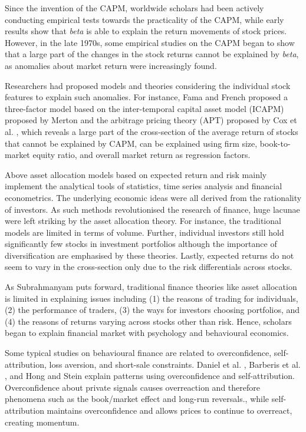 Since the invention of the CAPM, worldwide scholars had been actively conducting empirical tests towards the practicality of the CAPM, while early results show that \textit{beta} is able to explain the return movements of stock prices. However, in the late 1970s, some empirical studies on the CAPM began to show that a large part of the changes in the stock returns cannot be explained by \textit{beta}, as anomalies about market return were increasingly found.

Researchers had proposed models and theories considering the individual stock features to explain such anomalies. For instance, Fama and French \cite{intertemporal, options} proposed a three-factor model based on the inter-temporal capital asset model (ICAPM)  proposed by Merton \cite{riskfactors} and the arbitrage pricing theory (APT) proposed by Cox et al. \cite{anomalies}, which reveals a large part of the cross-section of the average return of stocks that cannot be explained by CAPM, can be explained using firm size, book-to-market equity ratio, and overall market return as regression factors.

Above asset allocation models based on expected return and risk mainly implement the analytical tools of statistics, time series analysis and financial econometrics. The underlying economic ideas were all derived from the rationality of investors. As such methods revolutionised the research of finance, huge lacunae were left striking by the asset allocation theory. For instance, the traditional models are limited in terms of volume. Further, individual investors still hold significantly few stocks in investment portfolios although the importance of diversification are emphasised by these theories. Lastly, expected returns do not seem to vary in the cross-section only due to the risk differentials across stocks.

As Subrahmanyam \cite{subrahmanyam2008behavioural} puts forward, traditional finance theories like asset allocation is limited in explaining issues including (1) the reasons of trading for individuals, (2) the performance of traders, (3) the ways for investors choosing portfolios, and (4) the reasons of returns varying across stocks other than risk. Hence, scholars began to explain financial market with psychology and behavioural economics.

Some typical studies on behavioural finance are related to overconfidence, self-attribution, loss aversion, and short-sale constraints. Daniel et al. \cite{daniel1998investor, daniel2001overconfidence}, Barberis et al. \cite{barberis1998model}, and Hong and Stein \cite{hong1999unified} explain patterns using overconfidence and self-attribution. Overconfidence about private signals causes overreaction and therefore phenomena such as the book/market effect and long-run reversals., while self-attribution maintains overconfidence and allows prices to continue to overreact, creating momentum.

